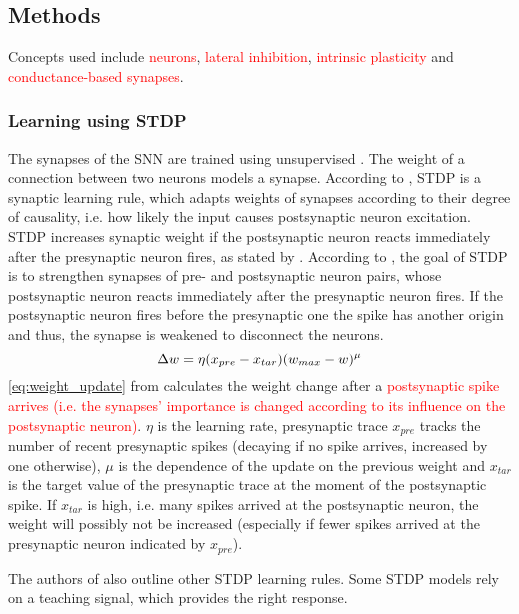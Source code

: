 \subsection{Methods}
\label{subsec:methods}

Concepts used include \textcolor{red}{ neurons}, \textcolor{red}{lateral inhibition}, \textcolor{red}{intrinsic plasticity} and \textcolor{red}{conductance-based synapses}.

\subsubsection{Learning using \ac{STDP}}
The synapses of the \ac{SNN} are trained using unsupervised . 
The weight of a connection between two neurons models a synapse.
According to \cite{STDP_like}, \ac{STDP} is a synaptic learning rule, which adapts weights of synapses according to their degree of causality, i.e. how likely the input causes postsynaptic neuron excitation.
\ac{STDP} increases synaptic weight if the postsynaptic neuron reacts immediately after the presynaptic neuron fires, as stated by \cite{object_detection_SNN}.
According to \cite{object_detection_SNN}, the goal of \ac{STDP} is to strengthen synapses of pre- and postsynaptic neuron pairs, whose postsynaptic neuron reacts immediately after the presynaptic neuron fires.
If the postsynaptic neuron fires before the presynaptic one the spike has another origin and thus, the synapse is weakened to disconnect the neurons.
%
\begin{equation}
    \centering
    \label{eq:weight_update}
    \Delta w = \eta (x_{pre} - x_{tar})(w_{max}-w)^\mu
\end{equation}
%
\autoref{eq:weight_update} from \cite{SNN} calculates the weight change after a \textcolor{red}{postsynaptic spike arrives (i.e. the synapses' importance is changed according to its influence on the postsynaptic neuron)}.
$\eta$ is the learning rate, presynaptic trace $x_{pre}$ tracks the number of recent presynaptic spikes (decaying if no spike arrives, increased by one otherwise), $\mu$ is the dependence of the update on the previous weight and $x_{tar}$ is the target value of the presynaptic trace at the moment of the postsynaptic spike.
If $x_{tar}$ is high, i.e. many spikes arrived at the postsynaptic neuron, the weight will possibly not be increased (especially if fewer spikes arrived at the presynaptic neuron indicated by  $x_{pre}$).

The authors of \cite{SNN} also outline other \ac{STDP} learning rules.
Some \ac{STDP} models rely on a teaching signal, which provides the right response. 


